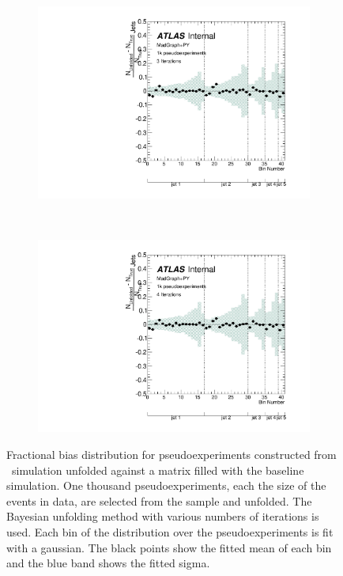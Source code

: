 \begin{figure}
\begin{subfigure}[]{0.5\textwidth}
\includegraphics[width=\textwidth]{fig/Stress/110872atlfast/FracBias3Iterations.pdf}
\end{subfigure}
~
\begin{subfigure}[]{0.5\textwidth}
\includegraphics[width=\textwidth]{fig/Stress/110872atlfast/FracBias4Iterations.pdf}
\end{subfigure}
\caption{Fractional bias distribution for pseudoexperiments constructed from \madpy\ simulation unfolded against a matrix filled with the baseline simulation. One thousand pseudoexperiments, each the size of the events in data, are selected from the sample and unfolded. The Bayesian unfolding method with various numbers of iterations is used. Each bin of the distribution over the pseudoexperiments is fit with a gaussian. The black points show the fitted mean of each bin and the blue band shows the fitted sigma.}
\label{fig:p8frbias}
\end{figure}
